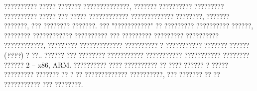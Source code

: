 ?????????? ????? ??????? ??????????????, ??????? ?????????? ????????? ?????????? ????? ??? ????? ???????????? ????????????? ????????, ??????? ???????, ??? ???????? ???????.  ??? "???????????" ?? ????????? ?????????? ??????, ???????? ???????????? ?????????? ??? ????????? ????????? ?????????? ????????????, ????????? ????????????? ?????????? ? ??????????? ??????? ?????? (\emph{????}) ? ??..  ?????? ??? ???????? ??????????? ??????????? ??????????? ???????? ?????? 2 -- x86, ARM.  ?????????? ???? ?????????? ?? ???? ?????? ? ????? ????????? ??????? ?? ? ?? ????????????? ??????????, ??? ??????? ?? ?? ??????????? ??? ????????.
